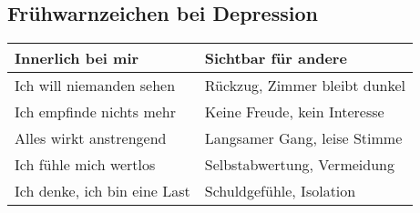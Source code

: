 \subsection*{\textcolor{ctmmBlue}{Frühwarnzeichen bei Depression}}

\begin{tabular}{|p{7cm}|p{7cm}|}
\hline
\textbf{Innerlich bei mir} & \textbf{Sichtbar für andere} \\
\hline
Ich will niemanden sehen & Rückzug, Zimmer bleibt dunkel \\
Ich empfinde nichts mehr & Keine Freude, kein Interesse \\
Alles wirkt anstrengend & Langsamer Gang, leise Stimme \\
Ich fühle mich wertlos & Selbstabwertung, Vermeidung \\
Ich denke, ich bin eine Last & Schuldgefühle, Isolation \\
\hline
\end{tabular}
